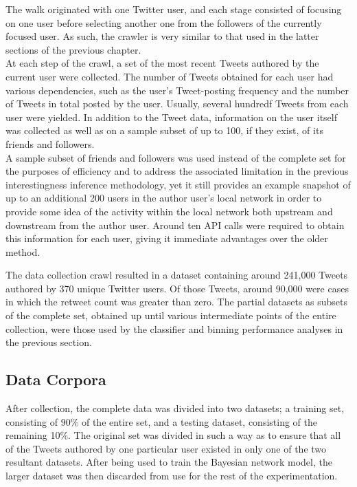 The walk originated with one Twitter user, and each stage consisted of focusing on one user before selecting another one from the followers of the currently focused user. As such, the crawler is very similar to that used in the latter sections of the previous chapter.\\
At each step of the crawl, a set of the most recent Tweets authored by the current user were collected. The number of Tweets obtained for each user had various dependencies, such as the user's Tweet-posting frequency and the number of Tweets in total posted by the user. Usually, several hundredf Tweets from each user were yielded. In addition to the Tweet data, information on the user itself was collected as well as on a sample subset of up to 100, if they exist, of its friends and followers.\\
A sample subset of friends and followers was used instead of the complete set for the purposes of efficiency and to address the associated limitation in the previous interestingness inference methodology, yet it still provides an example snapshot of up to an additional 200 users in the author user's local network in order to provide some idea of the activity within the local network both upstream and downstream from the author user. Around ten API calls were required to obtain this information for each user, giving it immediate advantages over the older method. 

The data collection crawl resulted in a dataset containing around 241,000 Tweets authored by 370 unique Twitter users. Of those Tweets, around 90,000 were cases in which the retweet count was greater than zero. The partial datasets as subsets of the complete set, obtained up until various intermediate points of the entire collection, were those used by the classifier and binning performance analyses in the previous section.



\subsection{Data Corpora}
After collection, the complete data was divided into two datasets; a training set, consisting of 90\% of the entire set, and a testing dataset, consisting of the remaining 10\%. The original set was divided in such a way as to ensure that all of the Tweets authored by one particular user existed in only one of the two resultant datasets. After being used to train the Bayesian network model, the larger dataset was then discarded from use for the rest of the experimentation.

